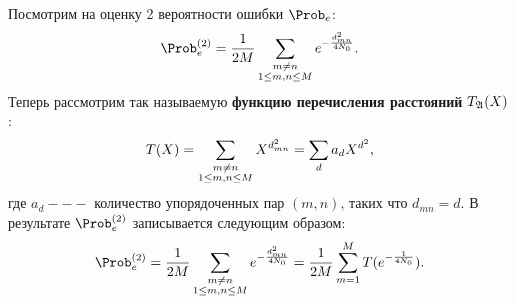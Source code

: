 \documentclass{book}
\numberwithin{theorem}{chapter}
\numberwithin{statement}{chapter}
\numberwithin{lemma}{chapter}
\theoremstyle{definition}
\numberwithin{task}{chapter}
\theoremstyle{remark}
\numberwithin{example}{chapter}
\theoremstyle{definition}
\numberwithin{definition}{chapter}
\theoremstyle{remark}
\theoremstyle{remark}
\numberwithin{lyrics}{section}
\begin{document}
%

%
%
%

Посмотрим на оценку 2 вероятности ошибки $\Prob_e$:
$$
\Prob_e^{(2)} = \frac{1}{2M}\Sum_{\substack{m \neq n \\ 1 \le m, n \le M}}  e^{-\frac{d^2_{mn}}{4N_0}}.
$$
Теперь рассмотрим так называемую \textbf{функцию перечисления расстояний} $T_{\mathfrak{A}}(X)$:
\begin{equation}
T(X) = \sum\limits_{\substack{m \neq n \\ 1 \le m, n \le M}} X^{d_{mn}^2} = \sum\limits_{d} a_d X^{d^2}, 
\end{equation}
где $a_d ---$ количество упорядоченных пар $(m,n)$, таких что $d_{mn} = d$. В результате $\Prob_e^{(2)}$ записывается следующим образом:
\begin{equation}
\Prob_e^{(2)} = \frac{1}{2M}\Sum_{\substack{m \neq n \\ 1 \le m, n \le M}} e^{-\frac{d_{mn}^2}{4N_0}} = \frac{1}{2M}\Sum_{m = 1}^M T(e^{-\frac{1}{4N_0}}).
\end{equation}
\end{document}
